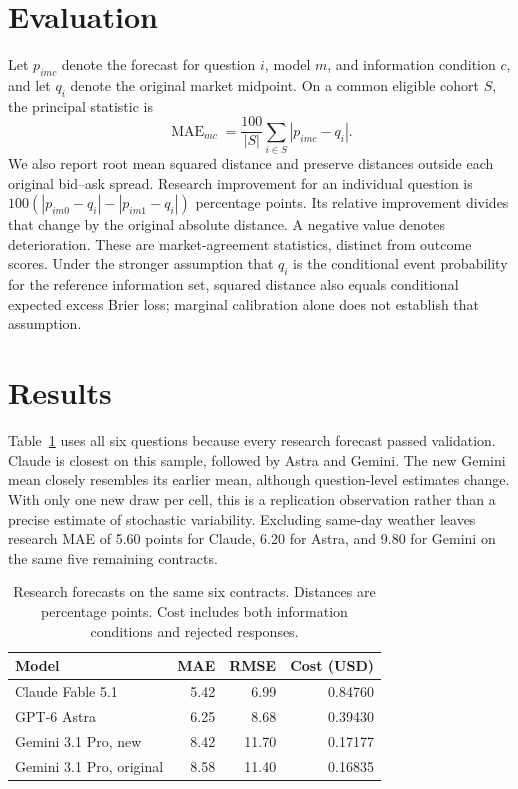 \documentclass[11pt]{article}
\begin{document}
\section{Evaluation}
Let $p_{imc}$ denote the forecast for question $i$, model $m$, and information
condition $c$, and let $q_i$ denote the original market midpoint. On a common
eligible cohort $S$, the principal statistic is
\[
 \operatorname{MAE}_{mc}=\frac{100}{|S|}\sum_{i\in S}|p_{imc}-q_i|.
\]
We also report root mean squared distance and preserve distances outside each
original bid--ask spread. Research improvement for an individual question is
$100(|p_{im0}-q_i|-|p_{im1}-q_i|)$ percentage points. Its relative improvement
divides that change by the original absolute distance. A negative value denotes
deterioration. These are market-agreement statistics, distinct from outcome
scores. Under the stronger assumption that $q_i$ is the conditional event
probability for the reference information set, squared distance also equals
conditional expected excess Brier loss; marginal calibration alone does not
establish that assumption.

\section{Results}
Table~\ref{tab:research} uses all six questions because every research forecast
passed validation. Claude is closest on this sample, followed by Astra and
Gemini. The new Gemini mean closely resembles its earlier mean, although
question-level estimates change. With only one new draw per cell, this is a
replication observation rather than a precise estimate of stochastic variability.
Excluding same-day weather leaves research MAE of 5.60 points for Claude,
6.20 for Astra, and 9.80 for Gemini on the same five remaining contracts.

\begin{table}[ht]
\centering
\caption{Research forecasts on the same six contracts. Distances are percentage
points. Cost includes both information conditions and rejected responses.}
\label{tab:research}
\begin{tabular}{lrrr}
\toprule Model & MAE & RMSE & Cost (USD) \\
\midrule
Claude Fable 5.1 & 5.42 & 6.99 & 0.84760 \\
GPT-6 Astra & 6.25 & 8.68 & 0.39430 \\
Gemini 3.1 Pro, new & 8.42 & 11.70 & 0.17177 \\
Gemini 3.1 Pro, original & 8.58 & 11.40 & 0.16835 \\
\bottomrule
\end{tabular}
\end{table}
\end{document}
